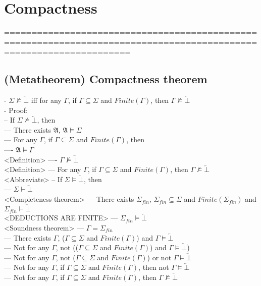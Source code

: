 \documentclass{book}
\newcommand{\inot}{\not}
\newcommand{\contr}{\overleftarrow{\bot}}
\begin{document}
\section{Compactness}
	===================================================================================================================
\subsection{(Metatheorem) Compactness theorem} %
	- $\Sigma \inot \vDash \contr$ iff for any $\Gamma$, if $\Gamma \subseteq \Sigma$ and $Finite(\Gamma)$, then $\Gamma \inot \vDash \contr$ \\
	- Proof: \\
		-- If $\Sigma \inot \vDash \contr$, then \\
			--- There exists $\mathfrak{A}$, $\mathfrak{A} \vDash \Sigma$ \\
			--- For any $\Gamma$, if $\Gamma \subseteq \Sigma$ and $Finite(\Gamma)$, then \\
				---- $\mathfrak{A} \vDash \Gamma$ \\ <Definition>
				---- $\Gamma \inot \vDash \contr$ \\ <Definition>
			--- For any $\Gamma$, if $\Gamma \subseteq \Sigma$ and $Finite(\Gamma)$, then $\Gamma \inot \vDash \contr$ \\ <Abbreviate>
		-- If $\Sigma \vDash \contr$, then \\
			--- $\Sigma \vdash \contr$ \\ <Completeness theorem>
			--- There exists $\Sigma_{fin}$, $\Sigma_{fin} \subseteq \Sigma$ and $Finite(\Sigma_{fin})$ and $\Sigma_{fin} \vdash \contr$ \\ <DEDUCTIONS ARE FINITE>
			--- $\Sigma_{fin} \vDash \contr$ \\ <Soundness theorem>
			--- $\Gamma = \Sigma_{fin}$ \\
			--- There exists $\Gamma$, ($\Gamma \subseteq \Sigma$ and $Finite(\Gamma)$) and $\Gamma \vDash \contr$ \\
			--- Not for any $\Gamma$, not (($\Gamma \subseteq \Sigma$ and $Finite(\Gamma)$) and $\Gamma \vDash \contr$) \\
			--- Not for any $\Gamma$, not ($\Gamma \subseteq \Sigma$ and $Finite(\Gamma)$) or not $\Gamma \vDash \contr$ \\
			--- Not for any $\Gamma$, if $\Gamma \subseteq \Sigma$ and $Finite(\Gamma)$, then not $\Gamma \vDash \contr$ \\
			--- Not for any $\Gamma$, if $\Gamma \subseteq \Sigma$ and $Finite(\Gamma)$, then $\Gamma \inot \vDash \contr$ \\
\end{document}
